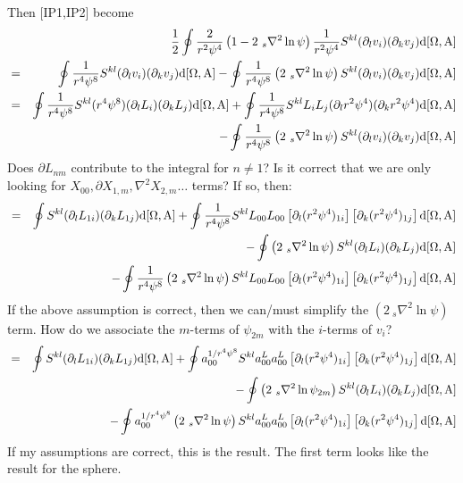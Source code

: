 \documentclass[11pt]{article}
\begin{document}
\newpage
\noindent
Then [IP1,IP2] become
\begin{eqnarray}
&&\frac{1}{2} \oint \frac{2}{r^2\psi^4} \left(1-2~_s\nabla^2 \ln \psi \right) \frac{1}{r^2 \psi^4} S^{kl} (\partial_l v_i)(\partial_k v_j) {\rm d [\Omega,A]} \\
&=& \oint \frac{1}{r^4 \psi^8}  S^{kl} (\partial_l v_i)(\partial_k v_j) {\rm d [\Omega,A]} -  \oint \frac{1}{r^4 \psi^8}  \left(2~_s\nabla^2 \ln \psi \right)S^{kl} (\partial_l v_i)(\partial_k v_j) {\rm d [\Omega,A]} \\
&=& \oint \frac{1}{r^4 \psi^8}  S^{kl} (r^4\psi^8) (\partial_l L_i)(\partial_k L_j) {\rm d [\Omega,A]} + \oint \frac{1}{r^4 \psi^8}  S^{kl} L_i L_j(\partial_l r^2\psi^4)(\partial_k r^2\psi^4) {\rm d [\Omega,A]} \\ \nonumber
&&-  \oint \frac{1}{r^4 \psi^8}  \left(2~_s\nabla^2 \ln \psi \right)S^{kl} (\partial_l v_i)(\partial_k v_j) {\rm d [\Omega,A]} \\
\end{eqnarray}
Does $\partial L_{nm}$ contribute to the integral for $n \ne 1$?  Is it correct that we are only looking for $X_{00}, \partial X_{1,m}, \nabla^2 X_{2,m} \ldots$ terms? If so, then:
\begin{eqnarray}
&=& \oint S^{kl} (\partial_l L_{1i})(\partial_k L_{1j}) {\rm d [\Omega,A]} 
+ \oint \frac{1}{r^4 \psi^8}  S^{kl} L_{00} L_{00} \left[ \partial_l (r^2\psi^4)_{1i} \right] \left[ \partial_k (r^2\psi^4)_{1j} \right] {\rm d [\Omega,A]} \\ \nonumber
&&- \oint  \left(2~_s\nabla^2 \ln \psi \right)S^{kl} (\partial_l L_i)(\partial_k L_j) {\rm d [\Omega,A]} \\ \nonumber
&&- \oint \frac{1}{r^4 \psi^8} \left(2~_s\nabla^2 \ln \psi \right) S^{kl} L_{00} L_{00}\left[ \partial_l (r^2\psi^4)_{1i} \right] \left[ \partial_k (r^2\psi^4)_{1j} \right] {\rm d [\Omega,A]}
\end{eqnarray}
If the above assumption is correct, then we can/must simplify the $\left(2~_s\nabla^2 \ln \psi \right)$ term.  How do we associate the $m$-terms of $\psi_{2m}$ with the $i$-terms of $v_i$?
\begin{eqnarray}
&=& \oint S^{kl} (\partial_l L_{1i})(\partial_k L_{1j}) {\rm d [\Omega,A]} 
+ \oint a_{00}^{1/r^4 \psi^8}  S^{kl} a_{00}^{L} a_{00}^{L} \left[ \partial_l (r^2\psi^4)_{1i} \right] \left[ \partial_k (r^2\psi^4)_{1j} \right] {\rm d [\Omega,A]} \\ \nonumber
&&- \oint  \left(2~_s\nabla^2 \ln \psi_{2m} \right)S^{kl} (\partial_l L_i)(\partial_k L_j) {\rm d [\Omega,A]} \\ \nonumber
&&- \oint a_{00}^{1/r^4 \psi^8} \left(2~_s\nabla^2 \ln \psi \right) S^{kl}a_{00}^{L} a_{00}^{L} \left[ \partial_l (r^2\psi^4)_{1i} \right] \left[ \partial_k (r^2\psi^4)_{1j} \right] {\rm d [\Omega,A]}
\end{eqnarray}
If my assumptions are correct, this is the result.  The first term looks like the result for the sphere.
\end{document}
